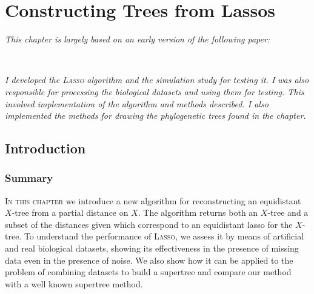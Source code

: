 \chapter{Constructing Trees from Lassos}
\label{cha:lasso-construction}

\textit{This chapter is largely based on an early version of the following
  paper:}

\vspace{0.5em}

\noindent
\noindent
{}\\


\vspace{1em}

\textit{\sffamily I developed the \textsc{Lasso} algorithm and the simulation
  study for testing it.  I was also responsible for processing the biological
  datasets and using them for testing.  This involved implementation of the
  algorithm and methods described.  I also implemented the methods for drawing
  the phylogenetic trees found in the chapter.}

\newpage

\section{Introduction}
\label{sec:introduction}

\subsection{Summary}

\textsc{In this chapter} we introduce a new algorithm for reconstructing an
equidistant $X$-tree from a partial distance on $X$.  The algorithm returns
both an $X$-tree and a subset of the distances given which correspond to an
equidistant lasso for the $X$-tree.  To understand the performance of
\textsc{Lasso}, we assess it by means of artificial and real biological
datasets, showing its effectiveness in the presence of missing data even in
the presence of noise.  We also show how it can be applied to the problem of
combining datasets to build a supertree and compare our method with a well
known supertree method.

